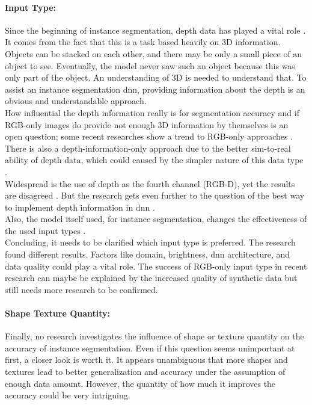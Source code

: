 		\paragraph{Input Type:} Since the beginning of instance segmentation, depth data has played a vital role \cite{Silbermann2012}. It comes from the fact that this is a task based heavily on 3D information. Objects can be stacked on each other, and there may be only a small piece of an object to see. Eventually, the model never saw such an object because this was only part of the object. An understanding of 3D is needed to understand that. To assist an instance segmentation \ac{dnn}, providing information about the depth is an obvious and understandable approach.\\
		How influential the depth information really is for segmentation accuracy and if RGB-only images do provide not enough 3D information by themselves is an open question; some recent researches show a trend to RGB-only approaches \cite{Raj2023}\cite{Zakeri2024}.\\
		There is also a depth-information-only approach due to the better sim-to-real ability of depth data, which could caused by the simpler nature of this data type \cite{Danielczuk2019}.\\
		Widespread is the use of depth as the fourth channel (RGB-D), yet the results are disagreed \cite{Lüling2021}\cite{Zakeri2024}.
		But the research gets even further to the question of the best way to implement depth information in \ac{dnn} \cite{Xiang2021}\cite{Xie2020}\cite{Pei2024}\cite{Yasir2022}\cite{Shao2018}\cite{Ye2017}.\\
		Also, the model itself used, for instance segmentation, changes the effectiveness of the used input types \cite{Xiang2021}.\\
		Concluding, it needs to be clarified which input type is preferred. The research found different results. Factors like domain, brightness, \ac{dnn} architecture, and data quality could play a vital role. The success of RGB-only input type in recent research \cite{Raj2023}\cite{Zakeri2024} can maybe be explained by the increased quality of synthetic data but still needs more research to be confirmed.
		\paragraph{Shape Texture Quantity:} Finally, no research investigates the influence of shape or texture quantity on the accuracy of instance segmentation. Even if this question seems unimportant at first, a closer look is worth it. It appears unambiguous that more shapes and textures lead to better generalization and accuracy under the assumption of enough data amount. However, the quantity of how much it improves the accuracy could be very intriguing. 
		


